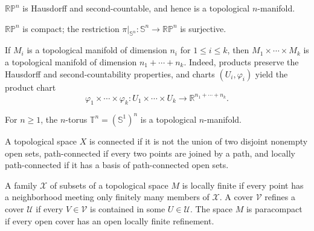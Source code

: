 \begin{proposition}
\label{exer:1-6}




$\mathbb{RP}^n$ is Hausdorff and second-countable, and hence is a topological
$n$-manifold.
\end{proposition}

\begin{proposition}
\label{exer:1-7}



$\mathbb{RP}^n$ is compact; the restriction
$\pi|_{\mathbb S^n}:\mathbb S^n\to\mathbb{RP}^n$ is surjective.
\end{proposition}

\begin{example}
\label{ex:1-8}




If $M_i$ is a topological manifold of dimension $n_i$ for $1\leq i\leq k$,
then $M_1\times\cdots\times M_k$ is a topological manifold of dimension
$n_1+\cdots+n_k$. Indeed, products preserve the Hausdorff and
second-countability properties, and charts $(U_i,\varphi_i)$ yield the product
chart
\[
\varphi_1\times\cdots\times\varphi_k:
U_1\times\cdots\times U_k\longrightarrow\mathbb R^{n_1+\cdots+n_k}.
\]
\end{example}

\begin{example}[Tori]
\label{ex:1-9}




For $n\geq1$, the $n$-torus
$\mathbb T^n=(\mathbb S^1)^n$ is a topological $n$-manifold.
\end{example}

\begin{definition}
\label{def:1-extra-3}



A topological space $X$ is connected if it is not the union of two disjoint
nonempty open sets, path-connected if every two points are joined by a path,
and locally path-connected if it has a basis of path-connected open sets.
\end{definition}

\begin{definition}
\label{def:1-extra-4}



A family $\mathcal X$ of subsets of a topological space $M$ is locally finite
if every point has a neighborhood meeting only finitely many members of
$\mathcal X$. A cover $\mathcal V$ refines a cover $\mathcal U$ if every
$V\in\mathcal V$ is contained in some $U\in\mathcal U$. The space $M$ is
paracompact if every open cover has an open locally finite refinement.
\end{definition}

